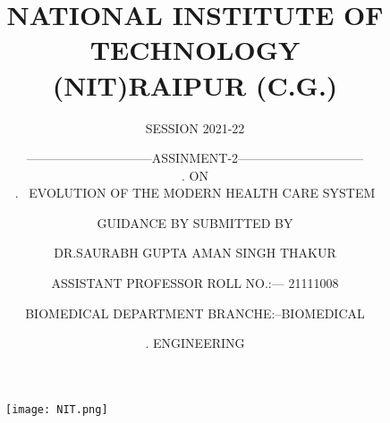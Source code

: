 \documentclass[12pt]{article}
\title{NATIONAL INSTITUTE OF TECHNOLOGY\\
(NIT)RAIPUR (C.G.)}
\author {SESSION 2021-22}
\date{}
\begin{document}
\maketitle
\begin{figure}[h]
\centering
\texttt{[image: NIT.png]}
\end{figure}
\author {------------------------------ASSINMENT-2------------------------------ \\
.\> \>\> \>\> \>\>\> \>\> \>\>\>\>\>\>  \>\> \>\>\> \>\> \>\> \> \>\> \>\> \>\> \>\> ON\\ 
.\> \>\> \>\> \>\ {EVOLUTION OF THE MODERN HEALTH CARE SYSTEM} }\\


\author{GUIDANCE BY \> \>\> \>\> \>\>\> \>\> \>\>\>\>\>\>  \>\> \>\>\> \>\> \>\> \> \>\> \>\> \>\> \>\>  SUBMITTED BY }\\


\author{DR.SAURABH GUPTA\>  \>\> \>\> \>  \>\> \>\>\>\>\>  \>\> \>\>\>  \>\> \>\> \>  \>\> AMAN SINGH THAKUR }\\

\author{ ASSISTANT PROFESSOR\>  \>\> \>  \> \>   \>\> \>\> \> \>\> \> \>\> \>  ROLL NO.:--- 21111008 }\\
\author{BIOMEDICAL DEPARTMENT\>  \>\> \>\> \>  \>\> \>\> \>\>   \>\> BRANCHE:--BIOMEDICAL  }\\
\author{.\>   \>\> \>\> \>  \>\> \>\> \>\> \>\> \>\> \>  \>\> \>\> \>\>\>\> \>\> \>\>  \>\> \>\> \>\> \>\>\> \>\> \>   \>\> \>\> \>\> \>\>\> \>\> \>    \>\> \>\> \>\> \>\> \>\> \>  \>\> \>\> \>\>  \>\> ENGINEERING }
\clearpage
\tableofcontents
\clearpage
\end{document}
